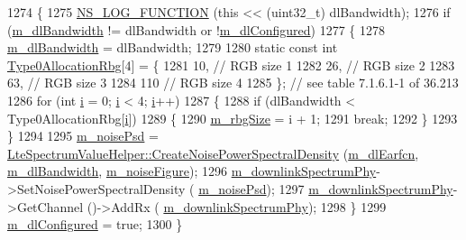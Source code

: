 \begin{DoxyCode}
1274 \{
1275   \hyperlink{log-macros-disabled_8h_a90b90d5bad1f39cb1b64923ea94c0761}{NS\_LOG\_FUNCTION} (\textcolor{keyword}{this} << (uint32\_t) dlBandwidth);
1276   \textcolor{keywordflow}{if} (\hyperlink{classns3_1_1LtePhy_a566aee423c957f3b7ab7f8f7eacc7eb3}{m\_dlBandwidth} != dlBandwidth or !\hyperlink{classns3_1_1LteUePhy_a2ec4449da14656cfde833329523aa1bf}{m\_dlConfigured})
1277     \{
1278       \hyperlink{classns3_1_1LtePhy_a566aee423c957f3b7ab7f8f7eacc7eb3}{m\_dlBandwidth} = dlBandwidth;
1279 
1280       \textcolor{keyword}{static} \textcolor{keyword}{const} \textcolor{keywordtype}{int} \hyperlink{namespacens3_ae42dc1cda5a7bc1f52f3c0ecf60f5f3b}{Type0AllocationRbg}[4] = \{
1281         10,     \textcolor{comment}{// RGB size 1}
1282         26,     \textcolor{comment}{// RGB size 2}
1283         63,     \textcolor{comment}{// RGB size 3}
1284         110     \textcolor{comment}{// RGB size 4}
1285       \};  \textcolor{comment}{// see table 7.1.6.1-1 of 36.213}
1286       \textcolor{keywordflow}{for} (\textcolor{keywordtype}{int} \hyperlink{bernuolliDistribution_8m_a6f6ccfcf58b31cb6412107d9d5281426}{i} = 0; \hyperlink{bernuolliDistribution_8m_a6f6ccfcf58b31cb6412107d9d5281426}{i} < 4; \hyperlink{bernuolliDistribution_8m_a6f6ccfcf58b31cb6412107d9d5281426}{i}++)
1287         \{
1288           \textcolor{keywordflow}{if} (dlBandwidth < Type0AllocationRbg[\hyperlink{bernuolliDistribution_8m_a6f6ccfcf58b31cb6412107d9d5281426}{i}])
1289             \{
1290               \hyperlink{classns3_1_1LtePhy_af18a95f518b590c96f32ef18fefed7f7}{m\_rbgSize} = i + 1;
1291               \textcolor{keywordflow}{break};
1292             \}
1293         \}
1294 
1295       \hyperlink{classns3_1_1LteUePhy_a527313b878e5c3103a76bedf25ea3f5c}{m\_noisePsd} = 
      \hyperlink{classns3_1_1LteSpectrumValueHelper_ac2cb4a9377ea954e990df6914b6dff4e}{LteSpectrumValueHelper::CreateNoisePowerSpectralDensity}
       (\hyperlink{classns3_1_1LtePhy_ac8fee98bfc4a1b1b5f3bbb6d721b3474}{m\_dlEarfcn}, \hyperlink{classns3_1_1LtePhy_a566aee423c957f3b7ab7f8f7eacc7eb3}{m\_dlBandwidth}, \hyperlink{classns3_1_1LtePhy_a89b2ff50bd38b68e02924bb9d6d193e2}{m\_noiseFigure});
1296       \hyperlink{classns3_1_1LtePhy_a9d9d4f9b07919b941583dca6f4789762}{m\_downlinkSpectrumPhy}->SetNoisePowerSpectralDensity (
      \hyperlink{classns3_1_1LteUePhy_a527313b878e5c3103a76bedf25ea3f5c}{m\_noisePsd});
1297       \hyperlink{classns3_1_1LtePhy_a9d9d4f9b07919b941583dca6f4789762}{m\_downlinkSpectrumPhy}->GetChannel ()->AddRx (
      \hyperlink{classns3_1_1LtePhy_a9d9d4f9b07919b941583dca6f4789762}{m\_downlinkSpectrumPhy});
1298     \}
1299   \hyperlink{classns3_1_1LteUePhy_a2ec4449da14656cfde833329523aa1bf}{m\_dlConfigured} = \textcolor{keyword}{true};
1300 \}
\end{DoxyCode}



